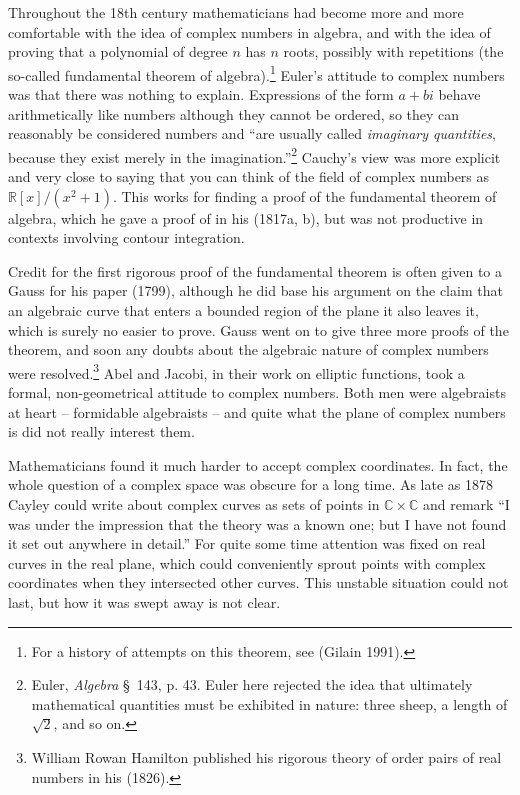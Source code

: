 \documentclass[11pt]{article}
\newcommand{\R}{\mathbb{R}}
\newcommand{\C}{\mathbb{C}}
\begin{document}
Throughout the 18th century mathematicians had become more and more comfortable with the idea of complex numbers in algebra, and with the idea of proving that a polynomial of degree $n$ has $n$ roots, possibly with repetitions (the so-called fundamental theorem of algebra).\footnote{For a history of attempts on this theorem, see (Gilain 1991).} Euler's attitude to complex numbers was that there was nothing to explain. Expressions of the form $a+bi$  behave arithmetically like numbers although they cannot be ordered, so they can reasonably be considered numbers  and ``are usually called \emph{imaginary quantities}, because they exist merely in the imagination.''\footnote{Euler, \emph{Algebra} \S\, 143, p. 43. Euler here rejected the idea that ultimately mathematical quantities must be exhibited in nature: three sheep, a length of $\sqrt{2}$, and so on.} Cauchy's view was more explicit and very close to saying that you can think of the field of complex numbers as $\R [x]/(x^2 + 1)$. This works for finding a proof of the fundamental theorem of algebra, which he gave a proof of in his (1817a, b), but was not productive in contexts involving contour integration. 

Credit for the first rigorous proof of the fundamental theorem is often given to a Gauss for his paper (1799), although he did base his argument on the claim that an algebraic curve that enters a bounded region of the plane it also leaves it,  which is surely no easier to prove.  Gauss went on to give three more proofs of the theorem, and soon any doubts about the algebraic nature of complex numbers were resolved.\footnote{William Rowan Hamilton published his rigorous theory of order pairs of real numbers in his (1826).} Abel and Jacobi, in their work  on elliptic functions, took a formal, non-geometrical attitude to complex numbers.  Both men were algebraists at heart -- formidable algebraists -- and quite what the plane of complex numbers is did not really interest them. 

Mathematicians found it  much harder to accept complex coordinates. In fact, the whole question of a complex space was obscure for a long time. As late as 1878 Cayley could write about complex curves as sets of points in $\C \times \C$ and remark ``I was under the impression that the theory was a known one; but I have not found it set out anywhere in detail.'' For quite some time attention was fixed on real curves in the real plane, which could conveniently sprout points with complex coordinates when they intersected other curves. This unstable situation could not last, but how it was swept away is not clear. 
\end{document}
